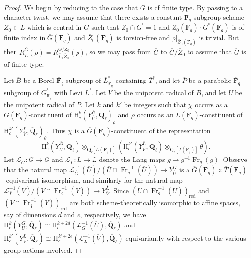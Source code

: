 \documentclass[reqno]{amsart}
\numberwithin{equation}{subsection}
\newcommand{\F}{\mathbf{F}}
\newcommand{\Q}{\mathbf{Q}}
\newcommand{\ol}[1]{\overline{#1}}
\newcommand{\co}{\colon}
\newcommand\cL{\mathcal{L}}
\DeclareMathOperator{\Fr}{Fr}
\newcommand{\rH}{\ensuremath{\mathrm{H}}\xspace}
\theoremstyle{remark}
\numberwithin{equation}{subsection}
\numberwithin{figure}{subsection}
\begin{document}
\begin{proof}
    We begin by reducing to the case that $\ol G$ is of finite type. By passing to a character twist, we may assume that there exists a constant $\F_q$-subgroup scheme $\ol Z_0 \subset \ol L$ which is central in $\ol G$ such that $\ol Z_0 \cap \ol G^\circ = 1$ and $\ol Z_0(\F_q) \cdot \ol G^\circ(\F_q)$ is of finite index in $\ol G(\F_q)$ and $\ol Z_0(\F_q)$ is torsion-free and $\rho|_{\ol Z_0(\F_q)}$ is trivial. But then $R_{\ol L}^{\ol G}(\rho) = R_{\ol L/\ol Z_0}^{\ol G/\ol Z_0}(\rho)$, so we may pass from $\ol G$ to $\ol G/\ol Z_0$ to assume that $\ol G$ is of finite type.
    
    Let $\ol B$ be a Borel $\ol\F_q$-subgroup of $\ol L^\circ_{\ol\F_q}$ containing $\ol T^\circ$, and let $\ol P$ be a parabolic $\ol\F_q$-subgroup of $\ol G^\circ_{\ol\F_q}$ with Levi $\ol L^\circ$. Let $\ol V$ be the unipotent radical of $\ol B$, and let $\ol U$ be the unipotent radical of $\ol P$. Let $k$ and $k'$ be integers such that $\chi$ occurs as a $\ol G(\F_q)$-constituent of $\rH_c^k(Y_{\ol U}^{\ol G}, \ol\Q_\ell)_\rho$ and $\rho$ occurs as an $\ol L(\F_q)$-constituent of $\rH_c^{k'}(Y_{\ol V}^{\ol L}, \ol\Q_\ell)_\theta$. Thus $\chi$ is a $\ol G(\F_q)$-constituent of the representation
    \[
    \rH_c^k(Y_{\ol U}^{\ol G}, \ol\Q_\ell) \otimes_{\ol\Q_\ell[\ol L(\F_q)]} (\rH_c^{k'}(Y_{\ol V}^{\ol L}, \ol\Q_\ell) \otimes_{\ol \Q_\ell[\ol T(\F_q)]} \theta).
    \]
    Let $\cL_{\ol G}\co \ol G \to \ol G$ and $\cL_{\ol L}\co \ol L \to \ol L$ denote the Lang maps $g \mapsto g^{-1}\Fr_q(g)$. Observe that the natural map $\cL_{\ol G}^{-1}(\ol U)/(\ol U \cap \Fr_q^{-1}(\ol U)) \to Y_{\ol U}^{\ol G}$ is a $\ol G(\F_q) \times \ol T(\F_q)$-equivariant isomorphism, and similarly for the natural map $\cL_{\ol L}^{-1}(\ol V)/(\ol V \cap \Fr_q^{-1}(\ol V)) \to Y_{\ol V}^{\ol L}$. Since $(\ol U \cap \Fr_q^{-1}(\ol U))_{\mathrm{red}}$ and $(\ol V \cap \Fr_q^{-1}(\ol V))_{\mathrm{red}}$ are both scheme-theoretically isomorphic to affine spaces, say of dimensions $d$ and $e$, respectively, we have $\rH_c^k(Y_{\ol U}^{\ol G}, \ol\Q_\ell) \cong \rH_c^{k+2d}(\cL_{\ol G}^{-1}(\ol U), \ol\Q_\ell)$ and $\rH_c^{k'}(Y_{\ol V}^{\ol L}, \ol\Q_\ell) \cong \rH_c^{k'+2e}(\cL_{\ol L}^{-1}(\ol V), \ol\Q_\ell)$ equivariantly with respect to the various group actions involved.


\end{proof}
\end{document}

